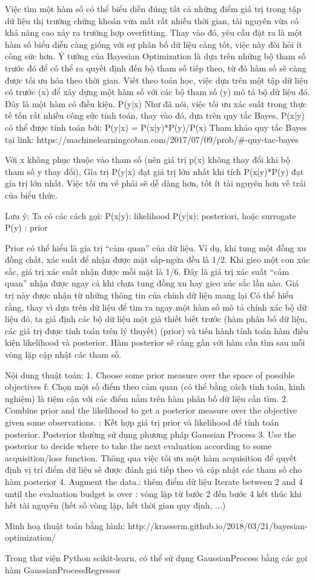 Việc tìm một hàm số có thể biểu diễn đúng tất cả những điểm giá trị trong tập dữ liệu thị trường chứng khoán vừa mất rất nhiều thời gian, tài nguyên vừa có khả năng cao xảy ra trường hợp overfitting. Thay vào đó, yêu cầu đặt ra là một hàm số biểu diễn càng giống với sự phân bố dữ liệu càng tốt, việc này đòi hỏi ít công sức hơn.
Ý tưởng của Bayesian Optimization là dựa trên những bộ tham số trước đó để có thể ra quyết định đến bộ tham số tiếp theo, từ đó hàm số sẽ càng được tối ưu hóa theo thời gian.
Viết theo toán học, việc dựa trên một tập dữ liệu có trước (x) để xây dựng một hàm số với các bộ tham số (y) mô tả bộ dữ liệu đó. Đây là một hàm có điều kiện.
P(y|x)
Như đã nói, việc tối ưu xác suất trong thực tế tốn rất nhiều công sức tính toán, thay vào đó, dựa trên quy tắc Bayes, P(x|y) có thể được tính toán bởi:
P(y|x) = P(x|y)*P(y)/P(x)
Tham khảo quy tắc Bayes tại link:
https://machinelearningcoban.com/2017/07/09/prob/#-quy-tac-bayes

Với x không phục thuộc vào tham số (nên giá trị p(x) không thay đổi khi bộ tham số y thay đổi), Gía trị P(y|x) đạt giá trị lớn nhất khi tích P(x|y)*P(y) đạt gía trị lớn nhất. Việc tối ưu vế phải sẽ dễ dàng hơn, tốt ít tài nguyên hơn vế trái của biểu thức.

Lưu ý: Ta có các cách gọi:
P(x|y): likelihood
P(y|x): posteriori, hoặc surrogate
P(y) : prior

Prior có thể hiểu là gía trị “cảm quan” của dữ liệu. Ví dụ, khi tung một đồng xu đồng chất, xác suất để nhận được mặt sấp-ngửa đều là 1/2. Khi gieo một con xúc sắc, giá trị xác suất nhận được mỗi mặt là 1/6. Đây là giá trị xác suất “cảm quan” nhận được ngay cả khi chưa tung đồng xu hay gieo xúc sắc lần nào. Giá trị này được nhận từ những thông tin của chính dữ liệu mang lại
Có thể hiểu rằng, thay vì dựa trên dữ liệu để tìm ra ngay một hàm số mô tả chính xác bộ dữ liệu đó, ta giả định các bộ dữ liệu một giả thiết biết trước (hàm phân bố dữ liệu, các giá trị được tính toán trên lý thuyết) (prior) và tiến hành tính toán hàm điều kiện likelihood và posterior. Hàm posterior sẽ càng gần với hàm cần tìm sau mỗi vòng lặp cập nhật các tham số.

Nội dung thuật toán:
1. Choose some prior measure over the space of possible objectives f: Chọn một số điểm theo cảm quan (có thể bằng cách tính toán, kinh nghiệm) là tiệm cận với các điểm nằm trên hàm phân bố dữ liệu cần tìm.
2. Combine prior and the likelihood to get a posterior measure over the objective given some observations. : Kết hợp giá trị prior và likelihood để tính toán posterior. Posterior thường sử dụng phương pháp Gaussian Process
3. Use the posterior to decide where to take the next evaluation according to some acquisition/loss function. Thông qua việc tối ưu một hàm acquisition để quyết định vị trí điểm dữ liệu sẽ được đánh giá tiếp theo và cập nhật các tham số cho hàm posterior
4. Augment the data.: thêm điểm dữ liệu 
Iterate between 2 and 4 until the evaluation budget is over : vòng lặp từ bước 2 đến bước 4 kết thúc khi hết tài nguyên (hết số vòng lặp, hết thời gian quy định, ...)

Minh hoạ thuật toán bằng hình: 
http://krasserm.github.io/2018/03/21/bayesian-optimization/

Trong thư viện Python scikit-learn, có thể sử dụng GaussianProcess bằng các gọi hàm GaussianProcessRegressor



